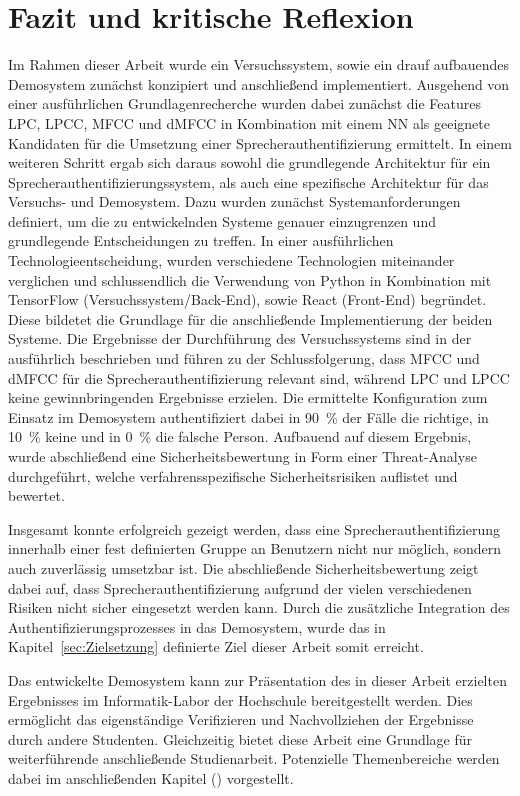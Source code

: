 \section{Fazit und kritische Reflexion}
Im Rahmen dieser Arbeit wurde ein Versuchssystem, sowie ein drauf aufbauendes Demosystem zunächst konzipiert und anschließend implementiert.
Ausgehend von einer ausführlichen Grundlagenrecherche wurden dabei zunächst die Features \ac{LPC}, \ac{LPCC}, \ac{MFCC} und \ac{dMFCC} in Kombination mit einem \ac{NN} als geeignete Kandidaten für die Umsetzung einer Sprecherauthentifizierung ermittelt.
In einem weiteren Schritt ergab sich daraus sowohl die grundlegende Architektur für ein Sprecherauthentifizierungssystem, als auch eine spezifische Architektur für das Versuchs- und Demosystem.
Dazu wurden zunächst Systemanforderungen definiert, um die zu entwickelnden Systeme genauer einzugrenzen und grundlegende Entscheidungen zu treffen.
In einer ausführlichen Technologieentscheidung, wurden verschiedene Technologien miteinander verglichen und schlussendlich die Verwendung von Python in Kombination mit TensorFlow (Versuchssystem/Back-End), sowie React (Front-End) begründet.
Diese bildetet die Grundlage für die anschließende Implementierung der beiden Systeme.
Die Ergebnisse der Durchführung des Versuchssystems sind in der  ausführlich beschrieben und führen zu der Schlussfolgerung, dass \ac{MFCC} und \ac{dMFCC} für die Sprecherauthentifizierung relevant sind, während \ac{LPC} und \ac{LPCC} keine gewinnbringenden Ergebnisse erzielen.
Die ermittelte Konfiguration zum Einsatz im Demosystem authentifiziert dabei in 90~\% der Fälle die richtige, in 10~\% keine und in 0~\% die falsche Person.
Aufbauend auf diesem Ergebnis, wurde abschließend eine Sicherheitsbewertung in Form einer Threat-Analyse durchgeführt, welche verfahrensspezifische Sicherheitsrisiken auflistet und bewertet.

Insgesamt konnte erfolgreich gezeigt werden, dass eine Sprecherauthentifizierung innerhalb einer fest definierten Gruppe an Benutzern nicht nur möglich, sondern auch zuverlässig umsetzbar ist.
Die abschließende Sicherheitsbewertung zeigt dabei auf, dass Sprecherauthentifizierung aufgrund der vielen verschiedenen Risiken nicht sicher eingesetzt werden kann.
Durch die zusätzliche Integration des Authentifizierungsprozesses in das Demosystem, wurde das in Kapitel~\ref{sec:Zielsetzung} definierte Ziel dieser Arbeit somit erreicht.

Das entwickelte Demosystem kann zur Präsentation des in dieser Arbeit erzielten Ergebnisses im Informatik-Labor der Hochschule bereitgestellt werden.
Dies ermöglicht das eigenständige Verifizieren und Nachvollziehen der Ergebnisse durch andere Studenten.
Gleichzeitig bietet diese Arbeit eine Grundlage für weiterführende anschließende Studienarbeit.
Potenzielle Themenbereiche werden dabei im anschließenden Kapitel () vorgestellt. 

